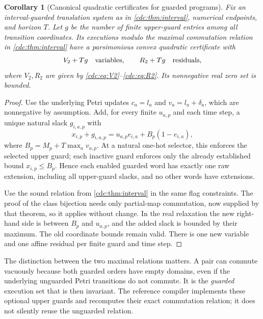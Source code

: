 \documentclass[11pt,a4paper]{article}
\newtheorem{corollary}[corollary]{Corollary}
\theoremstyle{definition}
\theoremstyle{remark}
\begin{document}
\begin{corollary}[Canonical quadratic certificates for guarded programs]\label{cdc:cor:guarded}
Fix an interval-guarded translation system as in \cref{cdc:thm:interval}, numerical endpoints, and horizon $T$. Let $g$ be the number of finite upper-guard entries among all transition coordinates. Its executions modulo the maximal commutation relation in \cref{cdc:thm:interval} have a parsimonious convex quadratic certificate with
\[
V_2+Tg\quad\hbox{variables},\qquad R_2+Tg\quad\hbox{residuals},
\]
where $V_2,R_2$ are given by \eqref{cdc:eq:V2}--\eqref{cdc:eq:R2}. Its nonnegative real zero set is bounded.
\end{corollary}
\begin{proof}
Use the underlying Petri updates $c_a=l_a$ and
$v_a=l_a+\delta_a$, which are nonnegative by assumption. Add, for every finite $u_{a,p}$ and each time step, a unique natural slack $g_{i,a,p}$ with
\begin{equation}\label{cdc:eq:upper-guard}
x_{i,p}+g_{i,a,p}
=u_{a,p}e_{i,a}+B_p(1-e_{i,a}),
\end{equation}
where $B_p=M_p+T\max_a v_{a,p}$. At a natural one-hot selector, this enforces the selected upper guard; each inactive guard enforces only the already established bound $x_{i,p}\le B_p$. Hence each enabled guarded word has exactly one raw extension, including all upper-guard slacks, and no other words have extensions.

Use the sound relation from \cref{cdc:thm:interval} in the same flag constraints. The proof of the class bijection needs only partial-map commutation, now supplied by that theorem, so it applies without change. In the real relaxation the new right-hand side is between $B_p$ and $u_{a,p}$, and the added slack is bounded by their maximum. The old coordinate bounds remain valid. There is one new variable and one affine residual per finite guard and time step.
\end{proof}

The distinction between the two maximal relations matters. A pair can commute vacuously because both guarded orders have empty domains, even if the underlying unguarded Petri transitions do not commute. It is the \emph{guarded} execution set that is then invariant. The reference compiler implements these optional upper guards and recomputes their exact commutation relation; it does not silently reuse the unguarded relation.


\end{document}
